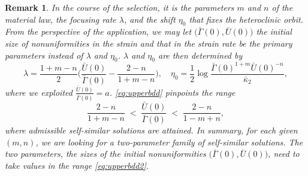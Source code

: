 \documentclass[a4paper,11pt]{article}
\def\bG{\bar{\Gamma}}
\def\bU{\bar{U}}
\newtheorem{remark}{Remark}[section]
\numberwithin{step}{dummy}
\begin{document}
\begin{remark}
In the course of the selection, it is the parameters $m$ and $n$ of the material law,  the focusing rate $\lambda$, and the shift $\eta_0$ 
that fixes the heteroclinic orbit. From the perspective of the application, we may let $\big(\bG(0),\bU(0))$ the initial size of nonuniformities in the strain and that in the strain rate be the primary parameters instead of $\lambda$ and $\eta_0$. $\lambda$ and $\eta_0$ are then determined by
\begin{equation}
 \lambda = \frac{1+m-n}{2}\Big(\frac{\bU(0)}{\bG(0)} - \frac{2-n}{1+m-n}\Big), \quad \eta_0 = \frac{1}{2}\log \frac{\bG(0)^{1+m}\bU(0)^{-n}}{\bar\kappa_2}, \label{eq:lambda_eta}
\end{equation}
where we exploited $\frac{\bU(0)}{\bG(0)} = a$. \eqref{eq:upperbdd} pinpoints the range  
\begin{equation} \label{eq:upperbdd2}
 \frac{2-n}{1+m-n} \;<\; \frac{\bU(0)}{\bG(0)} \;<\; \frac{2-n}{1-m+n},
\end{equation}
where admissible self-similar solutions are attained. In summary, for each given $(m,n)$, we are looking for a two-parameter family 
of self-similar solutions. The two parameters, the sizes of the initial nonuniformities $\big(\bG(0),\bU(0))$, need to take values
in the range  \eqref{eq:upperbdd2}. 
\end{remark}
\end{document}
